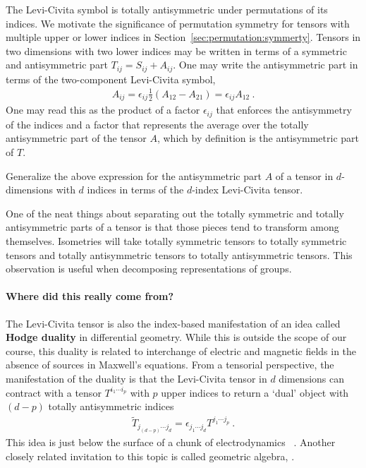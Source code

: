 \documentclass[12pt, oneside]{report}    %
\begin{document}
The Levi-Civita symbol is totally antisymmetric under permutations of its indices. We motivate the significance of permutation symmetry for tensors with multiple upper or lower indices in Section~\ref{sec:permutation:symmerty}. Tensors in two dimensions with two lower indices may be written in terms of a symmetric and antisymmetric part $T_{ij}= S_{ij} + A_{ij}$. One may write the antisymmetric part in terms of the two-component Levi-Civita symbol,
\begin{align}
    A_{ij} = \epsilon_{ij} \frac{1}{2} \left(A_{12}-A_{21}\right)
    =\epsilon_{ij} A_{12}
     \ .
    \label{eq:antisymmetric:wrt:levi:civita}
\end{align}
One may read this as the product of a factor $\epsilon_{ij}$ that enforces the antisymmetry of the indices and a factor that represents the average over the totally antisymmetric part of the tensor $A$, which by definition is the antisymmetric part of $T$.
\begin{exercise}
Generalize the above expression for the antisymmetric part $A$ of a tensor in $d$-dimensions with $d$ indices in terms of the $d$-index Levi-Civita tensor.
\end{exercise}
One of the neat things about separating out the totally symmetric and totally antisymmetric parts of a tensor is that those pieces tend to transform among themselves. Isometries will take totally symmetric tensors to totally symmetric tensors and totally antisymmetric tensors to totally antisymmetric tensors. This observation is useful when decomposing representations of groups.

\paragraph{Where did this really come from?}
% 
The Levi-Civita tensor is also the index-based manifestation of an idea called \textbf{Hodge duality} in differential geometry. While this is outside the scope of our course, this duality is related to interchange of electric and magnetic fields in the absence of sources in Maxwell's equations. From a tensorial perspective, the manifestation of the duality is that the Levi-Civita tensor in $d$ dimensions can contract with a tensor $T^{i_1\cdots i_p}$ with $p$ upper indices to return a `dual' object with $(d-p)$ totally antisymmetric indices
\begin{align}
   \tilde T_{j_{(d-p)}\cdots j_{d}} 
   = 
   \epsilon_{j_1 \cdots j_d}  T^{j_1 \cdots j_p} \ .
   \label{eq:Hodge:duality:epsilon}
\end{align}
This idea is just below the surface of a chunk of electrodynamics
~\autocite{Fumeron:2020bjj}. Another closely related invitation to this topic is called geometric algebra, \autocite{Doran:2007tqa}.
\end{document}
